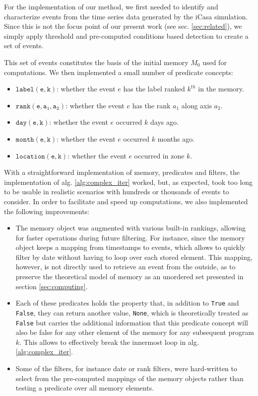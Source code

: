 \documentclass[conference]{IEEEtran}
\begin{document}
For the implementation of our method, we first needed to identify and
characterize events from the time series data generated by the iCasa simulation.
Since this is not the focus point of our present work (see sec.
\ref{sec:related}), we simply apply threshold and pre-computed conditions based
detection to create a set of events.

This set of events constitutes the basis of the initial memory $M_0$ used
for computations.
We then implemented a small number of predicate concepts:
\begin{itemize}
\item $\mathtt{label(e, k)}$: whether the event $e$ has the label ranked
        $k^{th}$ in the memory.
\item $\mathtt{rank(e, a_1, a_2)}$: whether the event $e$ has the rank $a_1$
along axis $a_2$.
\item $\mathtt{day(e, k)}$: whether the event $e$ occurred $k$ days ago.
\item $\mathtt{month(e, k)}$: whether the event $e$ occurred $k$ months
        ago.
\item $\mathtt{location(e, k)}$: whether the event $e$ occurred in zone
        $k$.
\end{itemize}

With a straightforward implementation of memory, predicates and filters, the
implementation of alg. \ref{alg:complex_iter} worked, but, as expected, took too
long to be usable in realistic scenarios with hundreds or thousands of events to
consider. In order to facilitate and speed up computations, we also implemented
the following improvements:
\begin{itemize}
  \item The memory object was augmented with various built-in rankings, allowing
  for faster operations during future filtering. For instance, since the memory
  object keeps a mapping from timestamps to events, which allows to quickly
  filter by date without having to loop over each stored element. This mapping,
  however, is not directly used to retrieve an event from the outside, as to
  preserve the theoretical model of memory as an unordered set presented in
  section \ref{sec:computing}.

  \item Each of these predicates holds the property that, in addition to
  \texttt{True} and \texttt{False}, they can return another value,
  \texttt{None}, which is theoretically treated as \texttt{False} but carries
  the additional information that this predicate concept will also be false for
  any other element of the memory for any subsequent program $k$. This allows to
  effectively break the innermost loop in alg. \ref{alg:complex_iter}.

  \item Some of the filters, for instance date or rank filters, were
  hard-written to select from the pre-computed mappings of the memory objects
  rather than testing a predicate over all memory elements.
\end{itemize}
\end{document}
